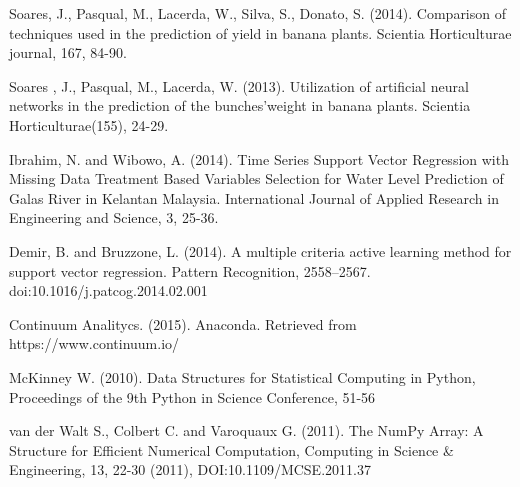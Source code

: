 \documentclass[review]{elsarticle}
\begin{document}
\begin{thebibliography}{1}
 Soares, J., Pasqual, M., Lacerda, W., Silva, S., Donato, S. (2014). Comparison of techniques used in the prediction of yield in banana plants. Scientia Horticulturae journal, 167, 84-90.

 Soares , J., Pasqual, M., Lacerda, W. (2013). Utilization of artificial neural networks in the prediction of the bunches’weight in banana plants. Scientia Horticulturae(155), 24-29.

  Ibrahim, N. and Wibowo, A. (2014). Time Series Support Vector Regression with Missing Data Treatment Based Variables Selection for Water Level Prediction of Galas River in Kelantan Malaysia. International Journal of Applied Research in Engineering and Science, 3, 25-36.

 Demir, B. and Bruzzone, L. (2014). A multiple criteria active learning method for support vector regression. Pattern Recognition, 2558–2567. doi:10.1016/j.patcog.2014.02.001

 Continuum Analitycs. (2015). Anaconda. Retrieved from https://www.continuum.io/

 McKinney W. (2010). Data Structures for Statistical Computing in Python, Proceedings of the 9th Python in Science Conference, 51-56 

 van der Walt S., Colbert C. and Varoquaux G. (2011). The NumPy Array: A Structure for Efficient Numerical Computation, Computing in Science \& Engineering, 13, 22-30 (2011), DOI:10.1109/MCSE.2011.37 




\end{thebibliography}
\end{document}
